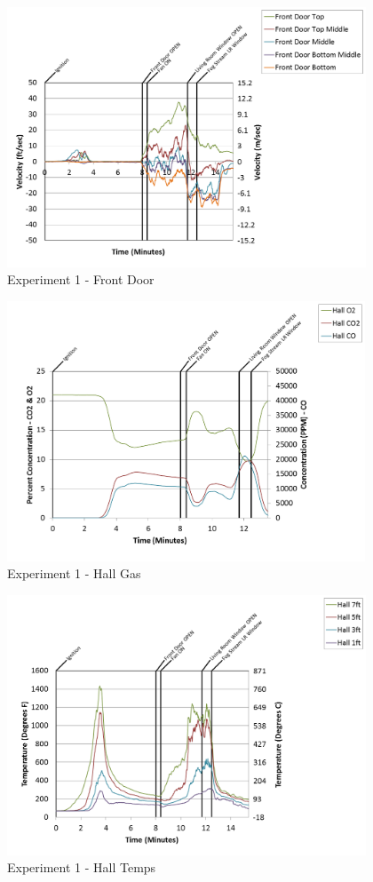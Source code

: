 \documentclass{article}
\begin{document}
\begin{appendices}
\begin{figure}[h!]
	\centering
	\includegraphics[height=3.05in]{0_Images/Results_Charts/Exp_1_Charts/FrontDoor.png}
	\caption{Experiment 1 - Front Door}
\end{figure}

\clearpage

\begin{figure}[h!]
	\centering
	\includegraphics[height=3.05in]{0_Images/Results_Charts/Exp_1_Charts/HallGas.png}
	\caption{Experiment 1 - Hall Gas}
\end{figure}


\begin{figure}[h!]
	\centering
	\includegraphics[height=3.05in]{0_Images/Results_Charts/Exp_1_Charts/HallTemps.png}
	\caption{Experiment 1 - Hall Temps}
\end{figure}


\end{appendices}
\end{document}
